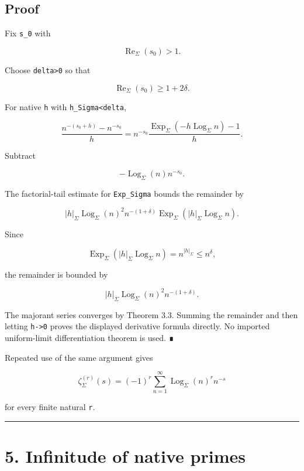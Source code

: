 \hypertarget{proof-7}{%
\subsection{Proof}\label{proof-7}}

Fix \texttt{s\_0} with

\[
\operatorname{Re}_\Sigma(s_0)>1.
\]

Choose \texttt{delta\textgreater{}0} so that

\[
\operatorname{Re}_\Sigma(s_0)
\ge1+2\delta.
\]

For native \texttt{h} with \texttt{\textbar{}h\textbar{}\_Sigma\textless{}delta},

\[
\frac{n^{-(s_0+h)}-n^{-s_0}}{h}
=
n^{-s_0}
\frac{
\operatorname{Exp}_\Sigma(-h\operatorname{Log}_\Sigma n)-1
}{h}.
\]

Subtract

\[
-\operatorname{Log}_\Sigma(n)n^{-s_0}.
\]

The factorial-tail estimate for \texttt{Exp\_Sigma} bounds the remainder by

\[
|h|_\Sigma
\operatorname{Log}_\Sigma(n)^2
n^{-(1+\delta)}
\operatorname{Exp}_\Sigma
(|h|_\Sigma\operatorname{Log}_\Sigma n).
\]

Since

\[
\operatorname{Exp}_\Sigma
(|h|_\Sigma\operatorname{Log}_\Sigma n)
=n^{|h|_\Sigma}
\le n^\delta,
\]

the remainder is bounded by

\[
|h|_\Sigma
\operatorname{Log}_\Sigma(n)^2
n^{-(1+\delta)}.
\]

The majorant series converges by Theorem 3.3. Summing the remainder and then
letting \texttt{h-\textgreater{}0} proves the displayed derivative formula directly. No imported
uniform-limit differentiation theorem is used. ∎

Repeated use of the same argument gives

\[
\boxed{
\zeta_\Sigma^{(r)}(s)
=(-1)^r
\sum_{n=1}^{\infty}
\operatorname{Log}_\Sigma(n)^r n^{-s}
}
\]

for every finite natural \texttt{r}.

\begin{center}\rule{0.5\linewidth}{0.5pt}\end{center}

\hypertarget{infinitude-of-native-primes}{%
\section{5. Infinitude of native primes}\label{infinitude-of-native-primes}}


